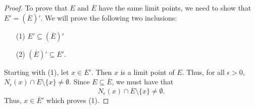 \documentclass[a4paper]{article}
\begin{document}
\begin{enumerate}
\begin{enumerate}
                \begin{proof}
                To prove that \( E  \) and \( \overline{E} \) have the same limit points, we need to show that \( E' = (\overline{E})' \). We will prove the following two inclusions:
                \begin{enumerate}
                    \item[(1)] \( E' \subseteq  (\overline{E})' \)
                    \item[(2)] \( (\overline{E})' \subseteq E' \).
                \end{enumerate}
                Starting with (1), let \( x \in E' \). Then \( x  \) is a limit point of \( E \). Thus, for all \( \epsilon > 0  \), \( {N}_{\epsilon}(x) \cap E \setminus  \{ x \}  \neq \emptyset \). Since \( E \subseteq \overline{E} \), we must have that   
                \[  {N}_{\epsilon}(x) \cap \overline{E} \setminus  \{ x \} \neq \emptyset. \]
                Thus, \( x \in \overline{E}' \) which proves (1).


\end{proof}
\end{enumerate}
\end{enumerate}
\end{document}
